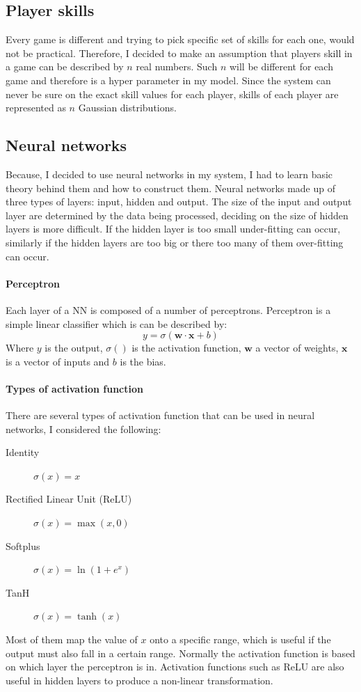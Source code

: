 \documentclass[12pt,a4paper]{book}
\newcommand\bs[1]{\boldsymbol{#1}}
\begin{document}
\subsection{Player skills}
Every game is different and trying to pick specific set of skills for each one, would not be practical.
Therefore, I decided to make an assumption that players skill in a game can be described by $n$ real numbers.
Such $n$ will be different for each game and therefore is a hyper parameter in my model.
Since the system can never be sure on the exact skill values for each player, skills of each player are represented as $n$ Gaussian distributions.
\subsection{Neural networks}
Because, I decided to use neural networks in my system, I had to learn basic theory behind them and how to construct them.
Neural networks made up of three types of layers: input, hidden and output.
The size of the input and output layer are determined by the data being processed, deciding on the size of hidden layers is more difficult.
If the hidden layer is too small under-fitting can occur, similarly if the hidden layers are too big or there too many of them over-fitting can occur.
\paragraph{Perceptron}
Each layer of a NN is composed of a number of perceptrons.
Perceptron is a simple linear classifier which is can be described by:
\begin{equation}
y = \sigma(\bs{w\cdot x}+b)
\end{equation}
Where $y$ is the output, $\sigma()$ is the activation function, $\bs{w}$ a vector of weights, $\bs{x}$ is a vector of inputs and $b$ is the bias.

\paragraph{Types of activation function}
There are several types of activation function that can be used in neural networks, I considered the following:
\begin{description}
\item[Identity] $\sigma(x) = x$
\item[Rectified Linear Unit (ReLU)] $\sigma(x) = \max(x,0)$
\item[Softplus] $\sigma(x) = \ln(1+e^x)$
\item[TanH] $\sigma(x) = \tanh(x)$
\end{description}
Most of them map the value of $x$ onto a specific range, which is useful if the output must also fall in a certain range.
Normally the activation function is based on which layer the perceptron is in.
Activation functions such as ReLU are also useful in hidden layers to produce a non-linear transformation.
\end{document}
